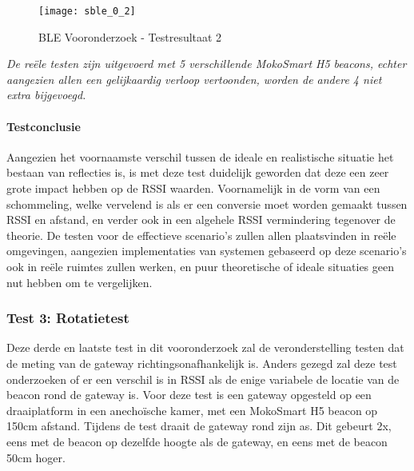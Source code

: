 \begin{figure}[h]
	\texttt{[image: sble\_0\_2]}
	\caption{BLE Vooronderzoek - Testresultaat 2}
	\label{fig:ond-ble-2-res}
\end{figure}

\emph{De reële testen zijn uitgevoerd met 5 verschillende MokoSmart H5 beacons, echter aangezien allen een gelijkaardig verloop vertoonden, worden de andere 4 niet extra bijgevoegd.}

\paragraph{Testconclusie}
Aangezien het voornaamste verschil tussen de ideale en realistische situatie het bestaan van reflecties is, is met deze test duidelijk geworden dat deze een zeer grote impact hebben op de RSSI waarden. Voornamelijk in de vorm van een schommeling, welke vervelend is als er een conversie moet worden gemaakt tussen RSSI en afstand, en verder ook in een algehele RSSI vermindering tegenover de theorie. 
De testen voor de effectieve scenario's zullen allen plaatsvinden in reële omgevingen, aangezien implementaties van systemen gebaseerd op deze scenario's ook in reële ruimtes zullen werken, en puur theoretische of ideale situaties geen nut hebben om te vergelijken.

\subsubsection{Test 3: Rotatietest}
\label{sec:ond-ble-0-3}
Deze derde en laatste test in dit vooronderzoek zal de veronderstelling testen dat de meting van de gateway richtingsonafhankelijk is. Anders gezegd zal deze test onderzoeken of er een verschil is in RSSI als de enige variabele de locatie van de beacon rond de gateway is.
Voor deze test is een gateway opgesteld op een draaiplatform in een anechoïsche kamer, met een MokoSmart H5 beacon op 150cm afstand. Tijdens de test draait de gateway rond zijn as. Dit gebeurt 2x, eens met de beacon op dezelfde hoogte als de gateway, en eens met de beacon 50cm hoger.


